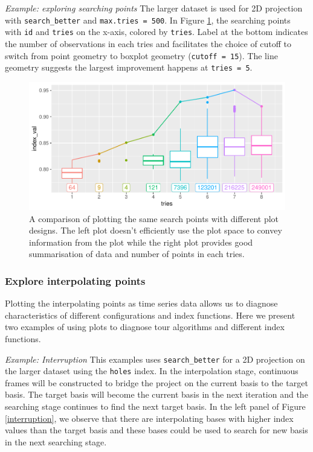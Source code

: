 \documentclass[12pt]{article}
\begin{document}
\emph{Example: exploring searching points} The larger dataset is used
for 2D projection with \texttt{search\_better} and
\texttt{max.tries\ =\ 500}. In Figure \ref{points}, the searching points
with \texttt{id} and \texttt{tries} on the x-axis, colored by
\texttt{tries}. Label at the bottom indicates the number of observations
in each tries and facilitates the choice of cutoff to switch from point
geometry to boxplot geometry (\texttt{cutoff\ =\ 15}). The line geometry
suggests the largest improvement happens at \texttt{tries\ =\ 5}.

\begin{figure}
\centering
\includegraphics{paper_files/figure-latex/points-tries-1.pdf}
\caption{\label{points}A comparison of plotting the same search points
with different plot designs. The left plot doesn't efficiently use the
plot space to convey information from the plot while the right plot
provides good summarisation of data and number of points in each tries.}
\end{figure}

\hypertarget{explore-interpolating-points}{%
\subsubsection{Explore interpolating
points}\label{explore-interpolating-points}}

Plotting the interpolating points as time series data allows us to
diagnose characteristics of different configurations and index
functions. Here we present two examples of using plots to diagnose tour
algorithms and different index functions.

\emph{Example: Interruption} This examples uses \texttt{search\_better}
for a 2D projection on the larger dataset using the \texttt{holes}
index. In the interpolation stage, continuous frames will be constructed
to bridge the project on the current basis to the target basis. The
target basis will become the current basis in the next iteration and the
searching stage continues to find the next target basis. In the left
panel of Figure \ref{interruption}, we observe that there are
interpolating bases with higher index values than the target basis and
these bases could be used to search for new basis in the next searching
stage.
\end{document}
